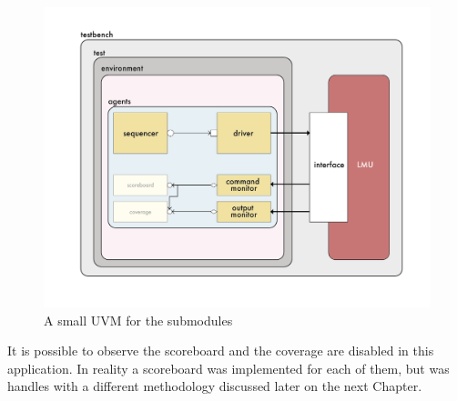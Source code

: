 \begin{figure}[H]
    \centering
    \includegraphics[scale = 0.7]{Chapter_1/img/sub-uvm.png}
    \caption{A small UVM for the submodules}
    \label{sub-uvm}
\end{figure}

It is possible to observe the scoreboard and the coverage are disabled in this application. In reality a scoreboard was implemented for each of them, but was handles with a different methodology discussed later on the next Chapter.